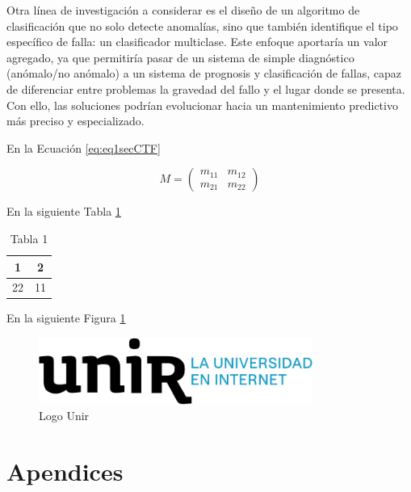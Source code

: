 \documentclass[11pt,a4paper,spanish]{book}
\numberwithin{equation}{chapter}
\numberwithin{figure}{chapter}
\begin{document}
Otra línea de investigación a considerar es el diseño de un algoritmo de clasificación
que no solo detecte anomalías, sino que también identifique el tipo específico de falla:
un clasificador multiclase.  Este enfoque aportaría un valor agregado, ya que permitiría
pasar de un sistema de simple diagnóstico (anómalo/no anómalo) a un sistema de prognosis
y clasificación de fallas, capaz de diferenciar entre problemas la gravedad del fallo y 
el lugar donde se presenta. Con ello, las soluciones podrían evolucionar hacia un 
mantenimiento predictivo más preciso y especializado.


En la Ecuación \eqref{eq:eq1secCTF}


\begin{equation}\label{eq:eq1secCTF}
M=\begin{pmatrix}
	m_{11}&m_{12}\\
	m_{21}&m_{22}
\end{pmatrix}
\end{equation}

En la siguiente Tabla \ref{tab:tab1secCTF}

\begin{table}[h]
\centering
\begin{tabular}{|c|c|}
	\hline
	1 & 2 \\
	\hline
	22 & 11 \\
	\hline
\end{tabular}
\caption{Tabla 1}
\label{tab:tab1secCTF}
\end{table}

En la siguiente Figura \ref{fig:fig1secCTF}

\begin{figure}[h]
\includegraphics[width= 0.8\textwidth]{logo_unir}
\caption{Logo Unir}
\label{fig:fig1secCTF}
\end{figure}

\cite{PIMENTEL2016744} \cite{da_S_Bessa_2023}




\appendix
\chapter{Apendices}
\end{document}
